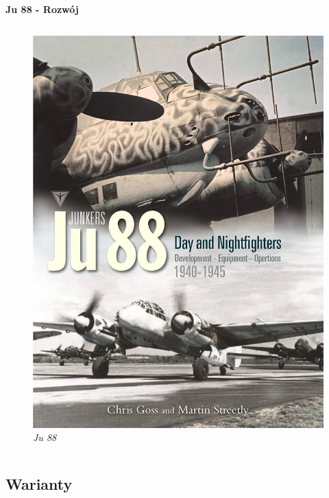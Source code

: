 \begin{frame}{\Huge{\textbf{Ju 88 - Rozwój}}}
\begin{columns}[t]
			\begin{figure}
				\centering
				\includegraphics[scale=0.145]{images/ju88-02.jpg}
				\caption{\textit{Ju 88}}
			\end{figure}
	\end{columns}
\end{frame}



\subsection{Warianty}


